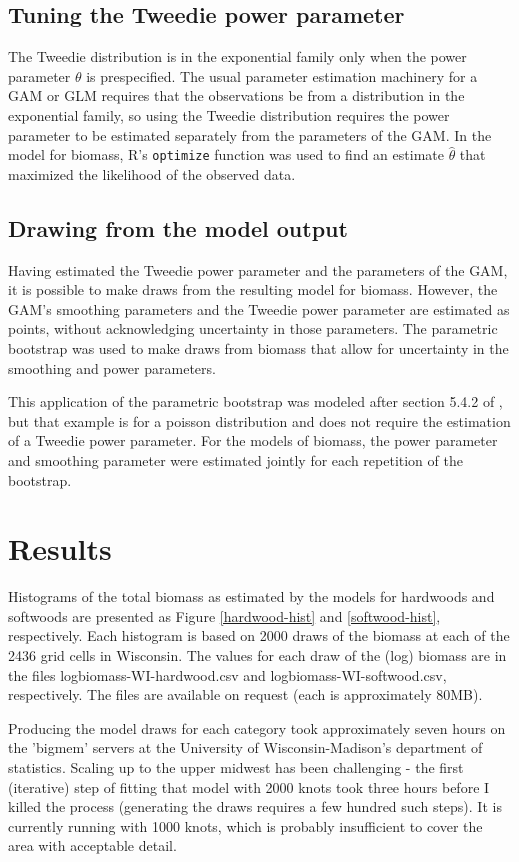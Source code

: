 \documentclass[authoryear, review, 11pt]{elsarticle}
\begin{document}
\subsection{Tuning the Tweedie power parameter}
The Tweedie distribution is in the exponential family only when the power parameter $\theta$ is prespecified. The usual parameter estimation machinery for a GAM or GLM requires that the observations be from a distribution in the exponential family, so using the Tweedie distribution requires the power parameter to be estimated separately from the parameters of the GAM. In the model for biomass, R's \verb!optimize! function was used to find an estimate $\hat{\theta}$ that maximized the likelihood of the observed data.

\subsection{Drawing from the model output}
Having estimated the Tweedie power parameter and the parameters of the GAM, it is possible to make draws from the resulting model for biomass. However, the GAM's smoothing parameters and the Tweedie power parameter are estimated as points, without acknowledging uncertainty in those parameters. The parametric bootstrap was used to make draws from biomass that allow for uncertainty in the smoothing and power parameters.

This application of the parametric bootstrap was modeled after section 5.4.2 of \cite{Wood-2006}, but that example is for a poisson distribution and does not require the estimation of a Tweedie power parameter. For the models of biomass, the power parameter and smoothing parameter were estimated jointly for each repetition of the bootstrap.


\section{Results}
Histograms of the total biomass as estimated by the models for hardwoods and softwoods are presented as Figure \ref{hardwood-hist} and \ref{softwood-hist}, respectively. Each histogram is based on 2000 draws of the biomass at each of the 2436 grid cells in Wisconsin. The values for each draw of the (log) biomass are in the files logbiomass-WI-hardwood.csv and logbiomass-WI-softwood.csv, respectively. The files are available on request (each is approximately 80MB).

Producing the model draws for each category took approximately seven hours on the 'bigmem' servers at the University of Wisconsin-Madison's department of statistics. Scaling up to the upper midwest has been challenging - the first (iterative) step of fitting that model with 2000 knots took three hours before I killed the process (generating the draws requires a few hundred such steps). It is currently running with 1000 knots, which is probably insufficient to cover the area with acceptable detail.
\end{document}

